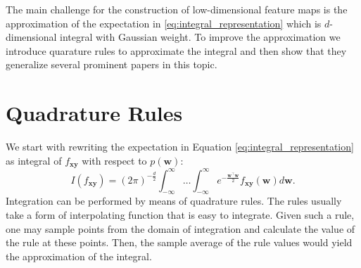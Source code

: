 The main challenge for the construction of low-dimensional feature maps is the approximation of the expectation in \eqref{eq:integral_representation} which is $d$-dimensional integral with Gaussian weight.
To improve the approximation we introduce quarature rules to approximate the integral
and then show that they generalize several prominent papers in this topic.


\section{Quadrature Rules}
\label{sec:quadrature_rule}
We start with rewriting the expectation in Equation \eqref{eq:integral_representation} as integral of $f_{\mathbf{xy}}$ with respect to $p(\mathbf{w})$:
\begin{equation*}
I(f_{\mathbf{xy}}) = (2\pi)^{-\frac{d}{2}} \int_{-\infty}^{\infty} \dots  \int_{-\infty}^{\infty} e^{-\frac{\mathbf{w}^{\boldsymbol{\top}}\mathbf{w}}{2}} f_{\mathbf{xy}}(\mathbf{w})d\mathbf{w}.
\end{equation*}
Integration can be performed by means of quadrature rules. The rules usually take a form of interpolating function that is easy to integrate. Given such a rule, one may sample points from the domain of integration and calculate the value of the rule at these points. Then, the sample average of the rule values would yield the approximation of the integral.

